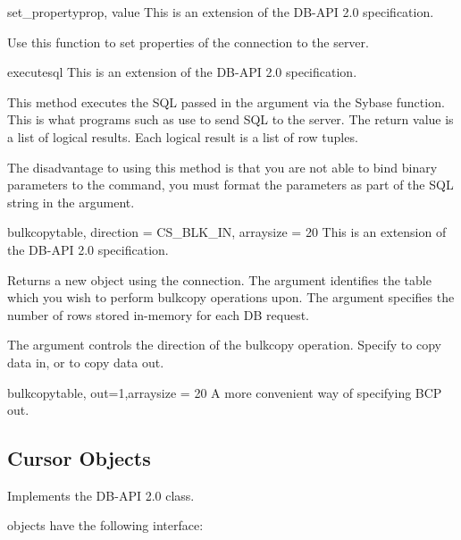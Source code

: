 \begin{methoddesc}[Connection]{set_property}{prop, value}
This is an extension of the DB-API 2.0 specification.

Use this function to set properties of the connection to the server.
\end{methoddesc}

\begin{methoddesc}[Connection]{execute}{sql}
This is an extension of the DB-API 2.0 specification.

This method executes the SQL passed in the  argument via the
 Sybase function.  This is what
programs such as  use to send SQL to the server.  The
return value is a list of logical results.  Each logical result is a
list of row tuples.

The disadvantage to using this method is that you are not able to bind
binary parameters to the command, you must format the parameters as
part of the SQL string in the  argument.
\end{methoddesc}

\begin{methoddesc}[Connection]{bulkcopy}{table, direction = CS_BLK_IN,
arraysize = 20}
This is an extension of the DB-API 2.0 specification.

Returns a new  object using the connection.  The
 argument identifies the table which you wish to perform
bulkcopy operations upon.  The  argument specifies the
number of rows stored in-memory for each DB request.

The  argument controls the direction of the bulkcopy
operation.  Specify  to copy data in, or
 to copy data out.
\end{methoddesc}

\begin{methoddesc}[Connection]{bulkcopy}{table, out=1,arraysize = 20}
A more convenient way of specifying BCP out.
\end{methoddesc}

\subsection{Cursor Objects}

Implements the DB-API 2.0  class.

 objects have the following interface:

